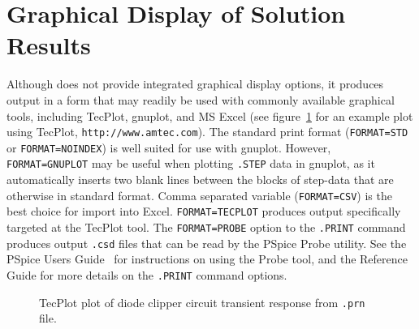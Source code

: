 \section{Graphical Display of Solution Results}
\label{Results}
Although \Xyce{} does not provide integrated graphical display options,
it produces output in a form that may readily be used with commonly
available graphical tools, including TecPlot, gnuplot, and MS Excel (see
figure~\ref{Clipper_TP} for an example plot using TecPlot,
\texttt{http://www.amtec.com}).  The standard \Xyce{} print format
(\texttt{FORMAT=STD} or \texttt{FORMAT=NOINDEX}) is well suited for
use with gnuplot.  However, \texttt{FORMAT=GNUPLOT} may be useful when 
plotting \texttt{.STEP} data in gnuplot, as it automatically inserts two 
blank lines between the blocks of step-data that are otherwise in 
standard format.  Comma separated variable (\texttt{FORMAT=CSV}) is
the best choice for import into Excel.  \texttt{FORMAT=TECPLOT}
produces output specifically targeted at the TecPlot tool. 
The \texttt{FORMAT=PROBE}
option to the \texttt{.PRINT} command produces output
\texttt{.csd} files that can be read by the PSpice
Probe utility.  See the PSpice
Users Guide~\cite{PSpiceUG:1998} for instructions on using the Probe
tool, and the \Xyce{} Reference Guide\ReferenceGuide{} for more details on 
the \texttt{.PRINT} command options.

\begin{figure}[h]
  \begin{centering}
    \caption{TecPlot plot of diode clipper circuit transient response from \Xyce{}
      \texttt{.prn} file.\label{Clipper_TP}}
  \end{centering}
\end{figure}


